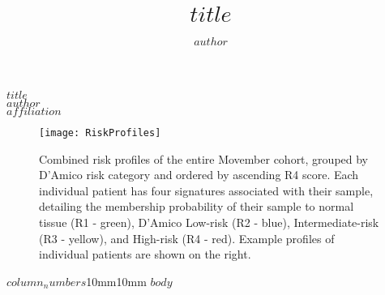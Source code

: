 \documentclass[article,$base_font_size$,extrafontsizes, showtrims]{memoir}
\author{$author$}
\title{$title$}
\begin{document}
\begin{mdframed}[style=brentsmdfstyle]

\renewcommand*\footnoterule{}
\renewcommand{\thempfootnote}{\footnotesize\color{footnotetextcol}{\arabic{mpfootnote}}}

\begingroup
  \centering
  \color{titletextcol}
\vspace{0.5in}
  \Huge{$title$}  \\[0.3in]
  \color{authortextcol} \normalsize{$author$} \\[0.2in]
  \color{affiliationtextcol} \footnotesize{$affiliation$}
  \vspace{0.125in}

  \endgroup
\end{mdframed}

\graphicspath{ {Figures/} }
\vspace{-10mm}
\begin{figure}
  \centering
  \texttt{[image: RiskProfiles]}
  \vspace{-10mm}
  \captionsetup{width=.95\linewidth}
  \caption{Combined risk profiles of the entire Movember cohort, grouped by D’Amico risk category and ordered by ascending R4 score.
  Each individual patient has four signatures associated with their sample, detailing the membership probability of their sample to normal tissue (R1 - green), D’Amico Low-risk (R2 - blue), Intermediate-risk (R3 - yellow), and High-risk (R4 - red). Example profiles of individual patients are shown on the right.}
  \vspace{-7mm}
\end{figure}
\begin{adjmulticols*}{$column_numbers$}{10mm}{10mm}
\normalsize{
\color{bodytextcol}
$body$
}
\end{adjmulticols*}
\end{document}
